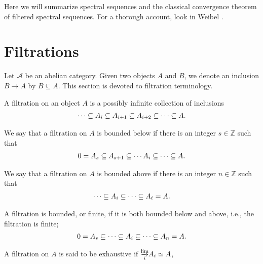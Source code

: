 \documentclass[../thesis.tex]{subfiles}
\begin{document}
    Here we will summarize spectral sequences and the classical convergence theorem of filtered spectral sequences. For a thorough account, look in Weibel \cite{Weibel94}.

    \section{Filtrations}
        Let $\mathcal{A}$ be an abelian category. Given two objects $A$ and $B$, we denote an inclusion $B \rightarrow A$ by $B \subseteq A$. This section is devoted to filtration terminology.

        \begin{definition}[Filtration]
            A filtration on an object $A$ is a possibly infinite collection of inclusions
            \begin{align*}
                \cdots \subseteq A_{i} \subseteq A_{i+1} \subseteq A_{i+2} \subseteq \cdots \subseteq A\tt{.}
            \end{align*}
        \end{definition}

        \begin{definition}
            We say that a filtration on $A$ is bounded below if there is an integer $s \in \mathbb{Z}$ such that
            \begin{align*}
                0 = A_s \subseteq A_{s+1} \subseteq \cdots A_i \subseteq \cdots \subseteq A\tt{.}
            \end{align*}

            We say that a filtration on $A$ is bounded above if there is an integer $n \in \mathbb{Z}$ such that
            \begin{align*}
                \cdots \subseteq A_i \subseteq \cdots \subseteq A_t = A\tt{.}
            \end{align*}

            A filtration is bounded, or finite, if it is both bounded below and above, i.e., the filtration is finite;
            \begin{align*}
                0 = A_s \subseteq \cdots \subseteq A_i \subseteq \cdots \subseteq A_n = A\tt{.}
            \end{align*}
        \end{definition}

        \begin{definition}
            A filtration on $A$ is said to be exhaustive if $\substack{\varinjlim \\ i} A_i \simeq A$,
            \begin{center}
            \end{center}
        \end{definition}
\end{document}
